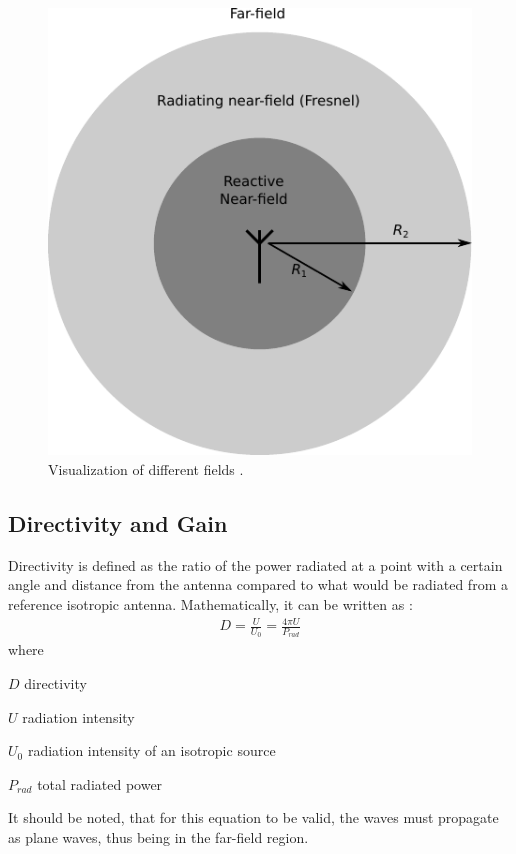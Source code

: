 \begin{figure}[htbp]
  \centering
  \includegraphics[scale=1]{img/analysis/radiationfields}
  \caption{Visualization of different fields \cite{balanis2012antenna}.}
  \label{fig:field-regions}
\end{figure}

\subsection{Directivity and Gain}
\label{subsec:dir_gain}
Directivity is defined as the ratio of the power radiated at a  point with a certain angle and distance from the antenna compared to what would be radiated from a reference isotropic antenna. Mathematically, it can be written as \cite{balanis2012antenna}: 
\begin{align}
  D = \frac{U}{U_0} = \frac{4 \pi U}{P_{rad}} 
\end{align}
where
\begin{where}
  \item[$D$] directivity
  \item[$U$] radiation intensity
  \item[$U_0$] radiation intensity of an isotropic source
  \item[$P_{rad}$] total radiated power 
\end{where}
It should be noted, that for this equation to be valid, the waves must propagate as plane waves, thus being in the far-field region.

